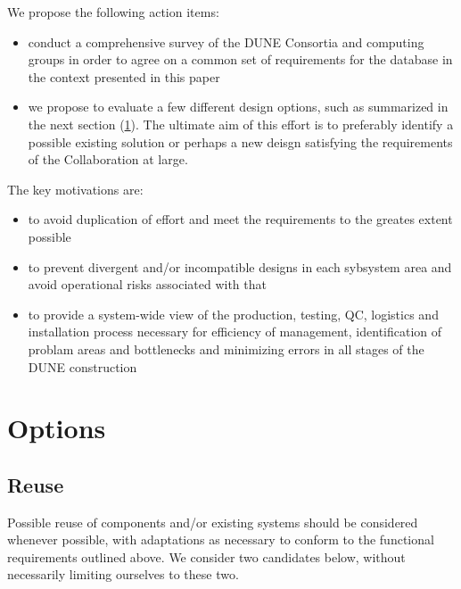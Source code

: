 \documentclass[pdftex,12pt,letter]{article}
\begin{document}
We propose the following action items:
\begin{itemize}

\item conduct a comprehensive survey of the DUNE Consortia and computing groups
in order to agree on a common set of requirements for the database in the context presented
in this paper

\item we propose to evaluate a few different design options, such as summarized in the
next section (\ref{options}). The ultimate aim of this effort is to preferably identify a possible
existing solution or perhaps a new deisgn satisfying the requirements of the Collaboration at large. 

\end{itemize}

\noindent The key motivations are:

\begin{itemize}

\item to avoid duplication of effort and meet the requirements to the greates extent possible

\item to prevent divergent and/or incompatible designs in each sybsystem area and avoid operational risks associated with that

\item to provide a system-wide view of the production, testing, QC, logistics and installation process necessary
for efficiency of management, identification of problam areas and bottlenecks and minimizing errors in all stages
of the DUNE construction

\end{itemize}


\section{Options}
\label{options}

\subsection{Reuse}
Possible reuse of components and/or existing systems should be considered whenever possible,
with adaptations as necessary to conform to the functional requirements outlined above. We consider
two candidates below, without necessarily limiting ourselves to these two.
\end{document}
